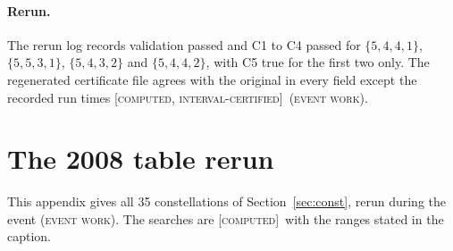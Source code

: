 \documentclass[11pt]{article}
\newcommand{\st}[1]{\textsc{[#1]}}
\newcommand{\stcert}{\st{computed, interval-certified}}
\newcommand{\stcomp}{\st{computed}}
\newcommand{\event}{\textsc{(event work)}}
\theoremstyle{definition}
\theoremstyle{remark}
\begin{document}
\paragraph{Rerun.} The rerun log records validation passed and C1 to C4 passed for $\{5,4,4,1\}$, $\{5,5,3,1\}$, $\{5,4,3,2\}$ and $\{5,4,4,2\}$, with C5 true for the first two only. The regenerated certificate file agrees with the original in every field except the recorded run times \stcert\ \event.

\section{The 2008 table rerun}\label{app:table}

\noindent This appendix gives all 35 constellations of Section~\ref{sec:const}, rerun during the event
\event. The searches are \stcomp\ with the ranges stated in the caption.
\end{document}
